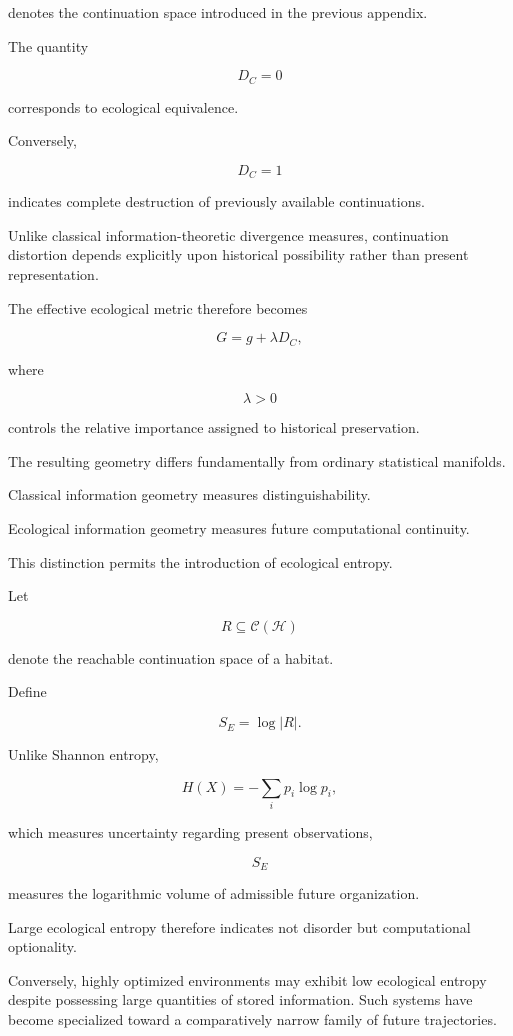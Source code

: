 \documentclass[12pt,oneside]{article}
\theoremstyle{remark}
\begin{document}
denotes the continuation space introduced in the previous appendix.

The quantity

\[
D_C
=
0
\]

corresponds to ecological equivalence.

Conversely,

\[
D_C
=
1
\]

indicates complete destruction of previously available continuations.

Unlike classical information-theoretic divergence measures, continuation
distortion depends explicitly upon historical possibility rather than present
representation.

The effective ecological metric therefore becomes

\[
G
=
g
+
\lambda
D_C,
\]

where

\[
\lambda
>
0
\]

controls the relative importance assigned to historical preservation.

The resulting geometry differs fundamentally from ordinary statistical
manifolds.

Classical information geometry measures distinguishability.

Ecological information geometry measures future computational continuity.

This distinction permits the introduction of ecological entropy.

Let

\[
R
\subseteq
\mathcal C(\mathcal H)
\]

denote the reachable continuation space of a habitat.

Define

\[
S_E
=
\log
|R|.
\]

Unlike Shannon entropy,

\[
H(X)
=
-\sum_i
p_i
\log p_i,
\]

which measures uncertainty regarding present observations,

\[
S_E
\]

measures the logarithmic volume of admissible future organization.

Large ecological entropy therefore indicates not disorder but computational
optionality.

Conversely, highly optimized environments may exhibit low ecological entropy
despite possessing large quantities of stored information. Such systems have
become specialized toward a comparatively narrow family of future trajectories.
\end{document}
